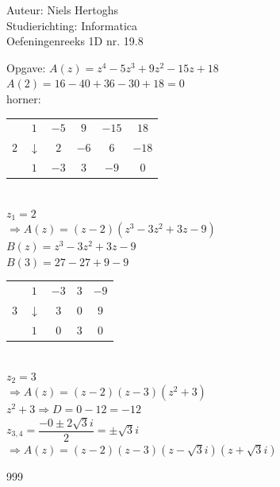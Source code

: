 \documentclass[a4paper]{article}
\begin{document}
  
\noindent \large Auteur: Niels Hertoghs			 	\\
\noindent \large Studierichting: Informatica	\\
\noindent \large Oefeningenreeks 1D nr. 19.8	\\

\medskip

\normalsize

Opgave: $A(z) = z^4 - 5z^3 + 9z^2 - 15z + 18$\\

$A(2) = 16 - 40 +36 - 30 + 18 = 0$\\

horner:\\

\begin{tabular} {c|cccc|c} & $1$ & $-5$ & $9$ & $-15$ & $18$\\      
$2$ & $\downarrow$ & $2$ & $-6$ & $6$ & $-18$\\ 
\hline & $1$ & $-3$ & $3$ & $-9$ & $0$\end{tabular} \\

$z_{1} = 2$\\

$\Rightarrow A(z) = (z - 2)(z^3 -3z^2 + 3z - 9)$\\

$B(z) = z^3 -3z^2 + 3z - 9$\\

$B(3) = 27 -27 + 9 - 9$\\

\begin{tabular} {c|ccc|c} & $1$ & $-3$ & $3$ & $-9$\\      
$3$ & $\downarrow$ & $3$ & $0$ & $9$\\ 
\hline & $1$ & $0$ & $3$ & $0$ \end{tabular} \\

$z_{2} = 3$\\

$\Rightarrow A(z) = (z - 2)(z - 3)(z^2 + 3)$ \\

$z^2 + 3 \Rightarrow D = 0 - 12 = -12 $\\

$z_{3, 4} = \dfrac{-0 \pm 2\sqrt{3}i}{2} = \pm \sqrt{3}i$\\

$\Rightarrow A(z) = (z - 2)(z - 3)(z - \sqrt{3}i)(z + \sqrt{3}i)$\\

\begin{thebibliography}{999}
\end{thebibliography}
\end{document}
